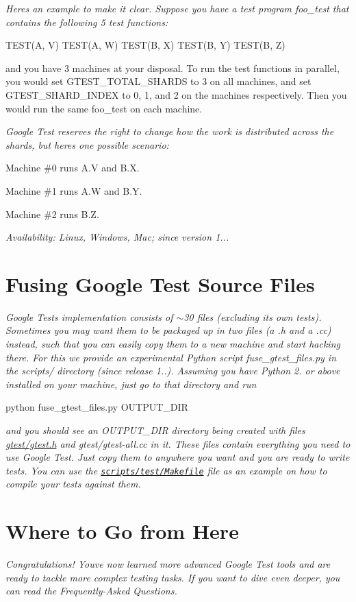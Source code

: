 {\itshape Here\textquotesingle{}s an example to make it clear. Suppose you have a test program {\ttfamily foo\+\_\+test} that contains the following 5 test functions\+: 
\begin{DoxyCode}
TEST(A, V)
TEST(A, W)
TEST(B, X)
TEST(B, Y)
TEST(B, Z)
\end{DoxyCode}
 and you have 3 machines at your disposal. To run the test functions in parallel, you would set {\ttfamily G\+T\+E\+S\+T\+\_\+\+T\+O\+T\+A\+L\+\_\+\+S\+H\+A\+R\+DS} to 3 on all machines, and set {\ttfamily G\+T\+E\+S\+T\+\_\+\+S\+H\+A\+R\+D\+\_\+\+I\+N\+D\+EX} to 0, 1, and 2 on the machines respectively. Then you would run the same {\ttfamily foo\+\_\+test} on each machine.}

{\itshape Google Test reserves the right to change how the work is distributed across the shards, but here\textquotesingle{}s one possible scenario\+:}

{\itshape 
\begin{DoxyItemize}
\item Machine \#0 runs {\ttfamily A.\+V} and {\ttfamily B.\+X}.
\item Machine \#1 runs {\ttfamily A.\+W} and {\ttfamily B.\+Y}.
\item Machine \#2 runs {\ttfamily B.\+Z}.
\end{DoxyItemize}}

{\itshape {\itshape Availability\+:} Linux, Windows, Mac; since version 1...}

{\itshape \section*{Fusing Google Test Source Files}}

{\itshape }

{\itshape Google Test\textquotesingle{}s implementation consists of $\sim$30 files (excluding its own tests). Sometimes you may want them to be packaged up in two files (a {\ttfamily .h} and a {\ttfamily .cc}) instead, such that you can easily copy them to a new machine and start hacking there. For this we provide an experimental Python script {\ttfamily fuse\+\_\+gtest\+\_\+files.\+py} in the {\ttfamily scripts/} directory (since release 1..). Assuming you have Python 2. or above installed on your machine, just go to that directory and run 
\begin{DoxyCode}
python fuse\_gtest\_files.py OUTPUT\_DIR
\end{DoxyCode}
}

{\itshape and you should see an {\ttfamily O\+U\+T\+P\+U\+T\+\_\+\+D\+IR} directory being created with files {\ttfamily \hyperlink{gtest_8h_source}{gtest/gtest.\+h}} and {\ttfamily gtest/gtest-\/all.\+cc} in it. These files contain everything you need to use Google Test. Just copy them to anywhere you want and you are ready to write tests. You can use the \href{../scripts/test/Makefile}{\tt scripts/test/\+Makefile} file as an example on how to compile your tests against them.}

{\itshape \section*{Where to Go from Here}}

{\itshape }

{\itshape Congratulations! You\textquotesingle{}ve now learned more advanced Google Test tools and are ready to tackle more complex testing tasks. If you want to dive even deeper, you can read the Frequently-\/\+Asked Questions. }